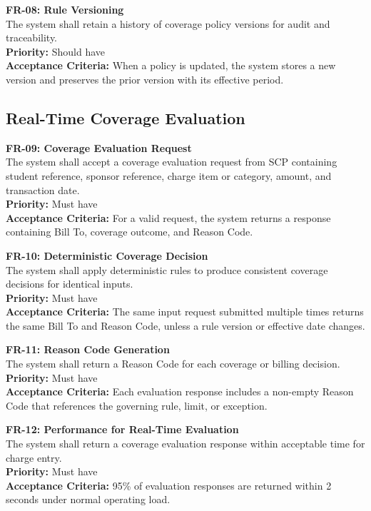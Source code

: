 \documentclass[12pt,a4paper]{article}
\begin{document}
\textbf{FR-08: Rule Versioning}\\
The system shall retain a history of coverage policy versions for audit and traceability.\\
\textbf{Priority:} Should have\\
\textbf{Acceptance Criteria:} When a policy is updated, the system stores a new version and preserves the prior version with its effective period.

\subsection{Real-Time Coverage Evaluation}

\textbf{FR-09: Coverage Evaluation Request}\\
The system shall accept a coverage evaluation request from SCP containing student reference, sponsor reference, charge item or category, amount, and transaction date.\\
\textbf{Priority:} Must have\\
\textbf{Acceptance Criteria:} For a valid request, the system returns a response containing Bill To, coverage outcome, and Reason Code.

\textbf{FR-10: Deterministic Coverage Decision}\\
The system shall apply deterministic rules to produce consistent coverage decisions for identical inputs.\\
\textbf{Priority:} Must have\\
\textbf{Acceptance Criteria:} The same input request submitted multiple times returns the same Bill To and Reason Code, unless a rule version or effective date changes.

\textbf{FR-11: Reason Code Generation}\\
The system shall return a Reason Code for each coverage or billing decision.\\
\textbf{Priority:} Must have\\
\textbf{Acceptance Criteria:} Each evaluation response includes a non-empty Reason Code that references the governing rule, limit, or exception.

\textbf{FR-12: Performance for Real-Time Evaluation}\\
The system shall return a coverage evaluation response within acceptable time for charge entry.\\
\textbf{Priority:} Must have\\
\textbf{Acceptance Criteria:} 95\% of evaluation responses are returned within 2 seconds under normal operating load.
\end{document}
